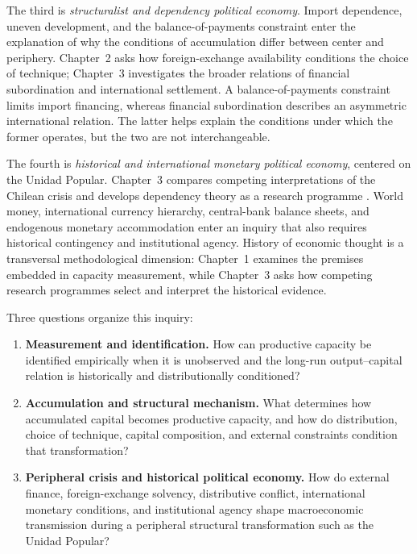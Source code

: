 The third is \emph{structuralist and dependency political economy}. Import dependence, uneven development, and the balance-of-payments constraint enter the explanation of why the conditions of accumulation differ between center and periphery. Chapter~2 asks how foreign-exchange availability conditions the choice of technique; Chapter~3 investigates the broader relations of financial subordination and international settlement. A balance-of-payments constraint limits import financing, whereas financial subordination describes an asymmetric international relation. The latter helps explain the conditions under which the former operates, but the two are not interchangeable.

The fourth is \emph{historical and international monetary political economy}, centered on the Unidad Popular. Chapter~3 compares competing interpretations of the Chilean crisis and develops dependency theory as a research programme \citep{Lakatos1978,Kvangraven2021}. World money, international currency hierarchy, central-bank balance sheets, and endogenous monetary accommodation enter an inquiry that also requires historical contingency and institutional agency. History of economic thought is a transversal methodological dimension: Chapter~1 examines the premises embedded in capacity measurement, while Chapter~3 asks how competing research programmes select and interpret the historical evidence.

Three questions organize this inquiry:
\begin{enumerate}[leftmargin=1.8em]
  \item \textbf{Measurement and identification.} How can productive capacity be identified empirically when it is unobserved and the long-run output--capital relation is historically and distributionally conditioned?
  \item \textbf{Accumulation and structural mechanism.} What determines how accumulated capital becomes productive capacity, and how do distribution, choice of technique, capital composition, and external constraints condition that transformation?
  \item \textbf{Peripheral crisis and historical political economy.} How do external finance, foreign-exchange solvency, distributive conflict, international monetary conditions, and institutional agency shape macroeconomic transmission during a peripheral structural transformation such as the Unidad Popular?
\end{enumerate}

